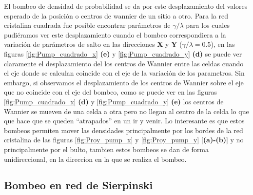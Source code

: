 El bombeo de densidad de probabilidad se da por este desplazamiento del valores esperado de la posición o centros de wannier de un sitio a otro. Para la red cristalina cuadrada fue posible encontrar parámetros de $\gamma/\lambda$ para los cuales pudiéramos ver este desplazamiento cuando el bombeo correspondiera a la variación de parámetros de salto en las direcciones \textbf{X}  y \textbf{Y} ($\gamma/\lambda  = 0.5$), en las figuras \ref{fig:Pump_cuadrado_x} \textbf{(e)} y \ref{fig:Pump_cuadrado_y} \textbf{(d)} se puede ver claramente el desplazamiento del los centros de Wannier entre las celdas cuando el eje donde se calculan coincide con el eje de la variación de los parametros. Sin embargo, si observamos el desplazamiento de los centros de Wannier sobre el eje que no coincide con el eje del bombeo, como se puede ver en las figuras \ref{fig:Pump_cuadrado_x} \textbf{(d)} y \ref{fig:Pump_cuadrado_y} \textbf{(e)} los centros de Wannier se mueven de una celda a otra pero no llegan al centro de la celda lo que que hace que se queden ``atrapados'' en un ir y venir. Lo interesante es que estos bombeos permiten mover las densidades principalmente por los bordes de la red cristalina de las figuras \ref{fig:Proy_pump_x} y \ref{fig:Proy_pump_y} [\textbf{(a)-(b)}] y no principalmente por el bulto, tambien estos bombeos se dan de forma unidireccional, en la direccion en la que se realiza el bombeo.


















\clearpage

\subsection{Bombeo en red de Sierpinski}


